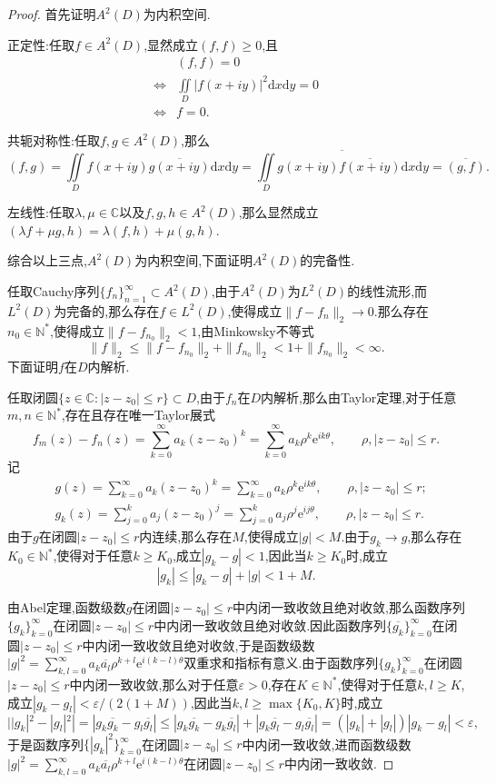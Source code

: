 \documentclass[lang = cn, scheme = chinese]{elegantbook}
\begin{document}
	\begin{proof}
		首先证明$A^2(D)$为内积空间.
		
		正定性:任取$f\in A^2(D)$,显然成立$(f,f)\ge 0$,且
		\begin{align*}
			&(f,f)=0\\
			\iff &\iint\limits_{D}|f(x+iy)|^2\mathrm{d}x\mathrm{d}y=0\\
			\iff &f=0.
		\end{align*}
		
		共轭对称性:任取$f,g\in A^2(D)$,那么
		$$
		(f,g)=\iint\limits_{D}f(x+iy)\overline{g(x+iy)}\mathrm{d}x\mathrm{d}y=\overline{\iint\limits_{D}g(x+iy)\overline{f(x+iy)}\mathrm{d}x\mathrm{d}y}=\overline{(g,f)}.
		$$
		
		左线性:任取$\lambda,\mu\in \mathbb{C}$以及$f,g,h\in A^2(D)$,那么显然成立$(\lambda f+\mu g,h)=\lambda(f,h)+\mu(g,h)$.
		
		综合以上三点,$A^2(D)$为内积空间,下面证明$A^2(D)$的完备性.
		
		任取Cauchy序列$\{f_n\}_{n=1}^\infty\subset A^2(D)$,由于$A^2(D)$为$L^2(D)$的线性流形,而$L^2(D)$为完备的,那么存在$f\in L^2(D)$,使得成立$\|f-f_n\|_2\to0$.那么存在$n_0\in\mathbb{N}^*$,使得成立$\|f-f_{n_0}\|_2<1$,由Minkowsky不等式
		$$
		\|f\|_2\le\|f-f_{n_0}\|_2+\|f_{n_0}\|_2<1+\|f_{n_0}\|_2<\infty.
		$$
		下面证明$f$在$D$内解析.
		
		任取闭圆$\{ z\in \mathbb{C}:|z-z_0|\le r \}\subset D$,由于$f_n$在$D$内解析,那么由Taylor定理,对于任意$m,n\in\mathbb{N}^*$,存在且存在唯一Taylor展式
		$$
		f_m(z)-f_n(z)=\sum_{k=0}^{\infty}a_k(z-z_0)^k=\sum_{k=0}^{\infty}a_k\rho^k\mathrm{e}^{ik\theta},\qquad \rho,|z-z_0|\le r.
		$$
		记
		\begin{align*}
			&g(z)=\sum_{k=0}^{\infty}a_k(z-z_0)^k=\sum_{k=0}^{\infty}a_k\rho^k\mathrm{e}^{ik\theta},\qquad \rho,|z-z_0|\le r;\\
			&g_k(z)=\sum_{j=0}^{k}a_j(z-z_0)^j=\sum_{j=0}^{k}a_j\rho^j\mathrm{e}^{ij\theta},\qquad \rho,|z-z_0|\le r.
		\end{align*}
		由于$g$在闭圆$|z-z_0|\le r$内连续,那么存在$M$,使得成立$|g|<M$.由于$g_k\to g$,那么存在$K_0\in\mathbb{N}^*$,使得对于任意$k\ge K_0$,成立$|g_k-g|<1$,因此当$k\ge K_0$时,成立
		$$
		|g_k|\le |g_k-g|+|g|<1+M.
		$$
		
		由Abel定理,函数级数$g$在闭圆$|z-z_0|\le r$中内闭一致收敛且绝对收敛,那么函数序列$\{g_k\}_{k=0}^{\infty}$在闭圆$|z-z_0|\le r$中内闭一致收敛且绝对收敛.因此函数序列$\{\overline{g_k}\}_{k=0}^{\infty}$在闭圆$|z-z_0|\le r$中内闭一致收敛且绝对收敛,于是函数级数$\displaystyle |g|^2=\sum_{k,l=0}^{\infty}a_k\overline{a_l}\rho^{k+l}\mathrm{e}^{i(k-l)\theta}$双重求和指标有意义.由于函数序列$\{g_k\}_{k=0}^{\infty}$在闭圆$|z-z_0|\le r$中内闭一致收敛,那么对于任意$\varepsilon>0$,存在$K\in\mathbb{N}^*$,使得对于任意$k,l\ge K$,成立$|g_k-g_l|<\varepsilon/(2(1+M))$,因此当$k,l\ge \max\{ K_0,K \}$时,成立
		$$
		||g_k|^2-|g_l|^2|=|g_k\overline{g_k}-g_l\overline{g_l}|\le |g_k\overline{g_k}-g_k\overline{g_l}|+|g_k\overline{g_l}-g_l\overline{g_l}|=(|g_k|+|g_l|)|g_k-g_l|<\varepsilon,
		$$
		于是函数序列$\{|g_k|^2\}_{k=0}^{\infty}$在闭圆$|z-z_0|\le r$中内闭一致收敛,进而函数级数$\displaystyle |g|^2=\sum_{k,l=0}^{\infty}a_k\overline{a_l}\rho^{k+l}\mathrm{e}^{i(k-l)\theta}$在闭圆$|z-z_0|\le r$中内闭一致收敛.
		

\end{proof}
\end{document}
